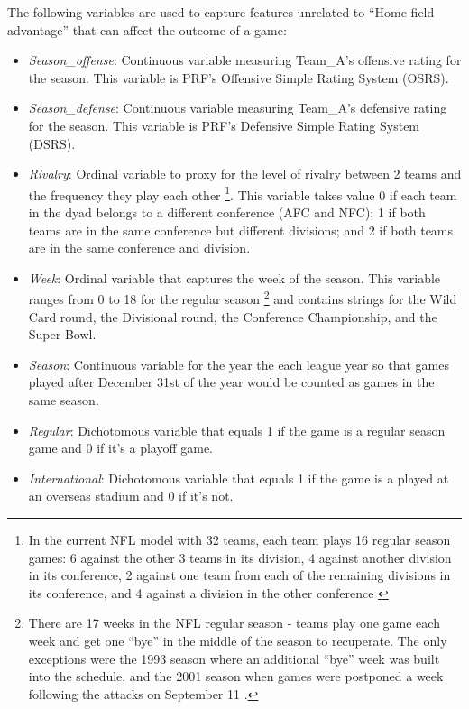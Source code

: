 \documentclass[12pt, letterpaper, twoside]{article}
\begin{document}
The following variables are used to capture features unrelated to ``Home field advantage'' that can affect the outcome of a game:
\begin{itemize}[noitemsep, leftmargin=*]

	\item \textit{Season\_offense}: Continuous variable measuring Team\_A's offensive rating for the season. This variable is PRF's Offensive Simple Rating System (OSRS). 
	
	\item \textit{Season\_defense}: Continuous variable measuring Team\_A's defensive rating for the season. This variable is PRF's Defensive Simple Rating System (DSRS). 

	\item \textit{Rivalry}: Ordinal variable to proxy for the level of rivalry between 2 teams and the frequency they play each other \footnote{In the current NFL model with 32 teams, each team plays 16 regular season games: 6 against the other 3 teams in its division, 4 against another division in its conference, 2 against one team from each of the remaining divisions in its conference, and 4 against a division in the other conference \citep{schedule} }. This variable takes value 0 if each team in the dyad belongs to a different conference (AFC and NFC); 1 if both teams are in the same conference but different divisions; and 2 if both teams are in the same conference and division. 
	
	\item \textit{Week}: Ordinal variable that captures the week of the season. This variable ranges from 0 to 18 for the regular season \footnote{\label{week}There are 17 weeks in the NFL regular season - teams play one game each week and get one ``bye'' in the middle of the season to recuperate. The only exceptions were the 1993 season where an additional ``bye'' week was built into the schedule, and the 2001 season when games were postponed a week following the attacks on September 11 \citep{regular}. } and contains strings for the Wild Card round, the Divisional round, the Conference Championship, and the Super Bowl. 
	
	\item \textit{Season}: Continuous variable for the year the each league year so that games played after December 31st of the year would be counted as games in the same season.
	
	\item \textit{Regular}: Dichotomous variable that equals 1 if the game is a regular season game and 0 if it's a playoff game. 
	
	\item \textit{International}: Dichotomous variable that equals 1 if the game is a played at an overseas stadium and 0 if it's not.  

\end{itemize}
\end{document}
